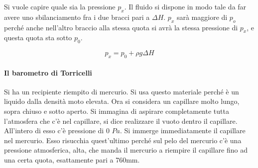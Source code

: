 \FloatBarrier
Si vuole capire quale sia la pressione $p_x$. Il fluido si dispone in modo tale da far avere uno sbilanciamento fra i due bracci pari a $\Delta H$. $p_x$ sarà maggiore di $p_o$ perché anche nell'altro braccio alla stessa quota si avrà la stessa pressione di $p_x$, e questa quota sta sotto $p_0$.

\[
	p_x = p_0 + \rho g\Delta H
\]

\paragraph{Il barometro di Torricelli} Si ha un recipiente riempito di mercurio. Si usa questo materiale perché è un liquido dalla densità moto elevata. Ora si considera un capillare molto lungo, sopra chiuso e sotto aperto. Si immagina di aspirare completamente tutta l'atmosfera che c'è nel capillare, si dice realizzare il vuoto dentro il capillare. All'intero di esso c'è pressione di 0 $Pa$. Si immerge immediatamente il capillare nel mercurio. Esso risucchia quest'ultimo perché sul pelo del mercurio c'è una pressione atmosferica, alta, che manda il mercurio a riempire il capillare fino ad una certa quota, esattamente pari a 760mm.


